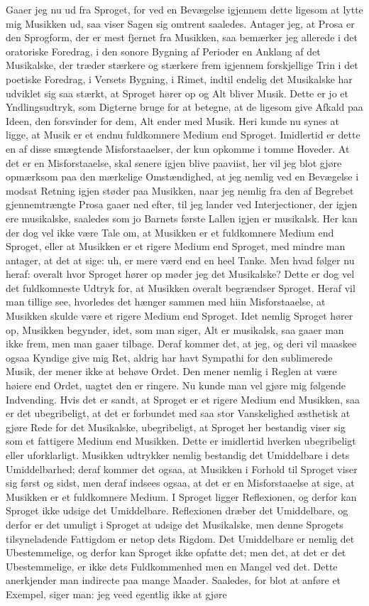 \documentclass[12pt,a4paper]{article}
\begin{document}
Gaaer jeg nu ud fra Sproget, for ved en Bevægelse igjennem dette ligesom at lytte mig Musikken ud, saa viser Sagen sig omtrent saaledes. Antager jeg, at Prosa er den Sprogform, der er mest fjernet fra Musikken, saa bemærker jeg allerede i det oratoriske Foredrag, i den sonore Bygning af Perioder en Anklang af det Musikalske, der træder stærkere og stærkere frem igjennem forskjellige Trin i det poetiske Foredrag, i Versets Bygning, i Rimet, indtil endelig det Musikalske har udviklet sig saa stærkt, at Sproget hører op og Alt bliver Musik. Dette er jo et Yndlingsudtryk, som Digterne bruge for at betegne, at de ligesom give Afkald paa Ideen, den forsvinder for dem, Alt ender med Musik. Heri kunde nu synes at ligge, at Musik er et endnu fuldkomnere Medium end Sproget. Imidlertid er dette en af disse smægtende Misforstaaelser, der kun opkomme i tomme Hoveder. At det er en Misforstaaelse, skal senere igjen blive paaviist, her vil jeg blot gjøre opmærksom paa den mærkelige Omstændighed, at jeg nemlig ved en Bevægelse i modsat Retning igjen støder paa Musikken, naar jeg nemlig fra den af Begrebet gjennemtrængte Prosa gaaer ned efter, til jeg lander ved Interjectioner, der igjen ere musikalske, saaledes som jo Barnets første Lallen igjen er musikalsk. Her kan der dog vel ikke være Tale om, at Musikken er et fuldkomnere Medium end Sproget, eller at Musikken er et rigere Medium end Sproget, med mindre man antager, at det at sige: uh, er mere værd end en heel Tanke. Men hvad følger nu heraf: overalt hvor Sproget hører op møder jeg det Musikalske? Dette er dog vel det fuldkomneste Udtryk for, at Musikken overalt begrændser Sproget. Heraf vil man tillige see, hvorledes det hænger sammen med hiin Misforstaaelse, at Musikken skulde være et rigere Medium end Sproget. Idet nemlig Sproget hører op, Musikken begynder, idet, som man siger, Alt er musikalsk, saa gaaer man ikke frem, men man gaaer tilbage. Deraf kommer det, at jeg, og deri vil maaskee ogsaa Kyndige give mig Ret, aldrig har havt Sympathi for den sublimerede Musik, der mener ikke at behøve Ordet. Den mener nemlig i Reglen at være høiere end Ordet, uagtet den er ringere. Nu kunde man vel gjøre mig følgende Indvending. Hvis det er sandt, at Sproget er et rigere Medium end Musikken, saa er det ubegribeligt, at det er forbundet med saa stor Vanskelighed æsthetisk at gjøre Rede for det Musikalske, ubegribeligt, at Sproget her bestandig viser sig som et fattigere Medium end Musikken. Dette er imidlertid hverken ubegribeligt eller uforklarligt. Musikken udtrykker nemlig bestandig det Umiddelbare i dets Umiddelbarhed; deraf kommer det ogsaa, at Musikken i Forhold til Sproget viser sig først og sidst, men deraf indsees ogsaa, at det er en Misforstaaelse at sige, at Musikken er et fuldkomnere Medium. I Sproget ligger Reflexionen, og derfor kan Sproget ikke udsige det Umiddelbare. Reflexionen dræber det Umiddelbare, og derfor er det umuligt i Sproget at udsige det Musikalske, men denne Sprogets tilsyneladende Fattigdom er netop dets Rigdom. Det Umiddelbare er nemlig det Ubestemmelige, og derfor kan Sproget ikke opfatte det; men det, at det er det Ubestemmelige, er ikke dets Fuldkommenhed men en Mangel ved det. Dette anerkjender man indirecte paa mange Maader. Saaledes, for blot at anføre et Exempel, siger man: jeg veed egentlig ikke at gjøre 
\end{document}
